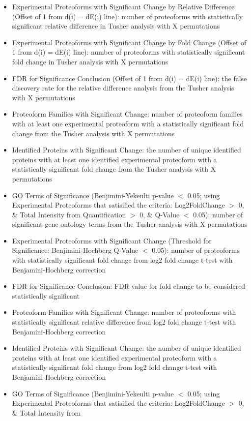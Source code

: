 \begin{itemize}
\begin{itemize}
\item Experimental Proteoforms with Significant Change by Relative Difference (Offset of 1 from d(i) = dE(i) line): number of proteoforms with statistically significant relative difference in Tusher analysis with X permutations
\item Experimental Proteoforms with Significant Change by Fold Change (Offset of 1 from d(i) = dE(i) line): number of proteoforms with statistically significant fold change in Tusher analysis with X permutations
\item FDR for Significance Conclusion (Offset of 1 from d(i) = dE(i) line): the false discovery rate for the relative difference analysis from the Tusher analysis with X permutations
\item Proteoform Families with Significant Change: number of proteoform families with at least one experimental proteoform with a statistically significant fold change from the Tusher analysis with X permutations
\item Identified Proteins with Significant Change: the number of unique identified proteins with at least one identified experimental proteoform with a statistically significant fold change from the Tusher analysis with X permutations
\item GO Terms of Significance (Benjimini-Yekeulti p-value $<$ 0.05; using Experimental Proteoforms that satisified the criteria:  Log2FoldChange $>$ 0, \& Total Intensity from Quantification $>$ 0, \& Q-Value $<$ 0.05): number of significant gene ontology terms from the Tusher analysis with X permutations
\item Experimental Proteoforms with Significant Change (Threshold for Significance: Benjimini-Hochberg Q-Value $<$ 0.05): number of proteoforms with statistically significant fold change from log2 fold change t-test with Benjamini-Hochberg correction
\item FDR for Significance Conclusion: FDR value for fold change to be considered statistically significant
\item Proteoform Families with Significant Change: number of proteoforms with statistically significant  relative difference from log2 fold change t-test with Benjamini-Hochberg correction
\item Identified Proteins with Significant Change: the number of unique identified proteins with at least one identified experimental proteoform with a statistically significant fold change from log2 fold change t-test with Benjamini-Hochberg correction
\item GO Terms of Significance (Benjimini-Yekeulti p-value $<$ 0.05; using Experimental Proteoforms that satisified the criteria:  Log2FoldChange $>$ 0, \& Total Intensity from 

\end{itemize}
\end{itemize}
